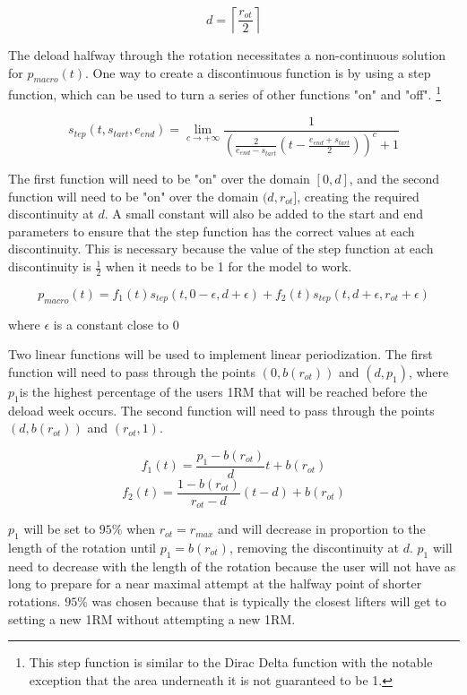 \begin{equation}
    d=\left\lceil\frac{r_{ot}}{2}\right\rceil
\end{equation}

The deload halfway through the rotation necessitates a non-continuous solution for $p_{macro}(t)$. One way to create a  discontinuous function is by using a step function, which can be used to turn a series of other functions "on" and "off". \footnote{This step function is similar to the Dirac Delta function with the notable exception that the area underneath it is not guaranteed to be 1.}

\begin{equation}
    s_{tep}(t,s_{tart},e_{end})=
    \lim_{c \to +\infty} 
    \frac{1}{\left(\frac{2}{e_{end}-s_{tart}}\left(t-\frac{e_{end}+s_{tart}}{2}\right)\right)^c+1}
\end{equation}

The first function will need to be "on" over the domain $[0,d]$, and the second function will need to be "on" over the domain $(d,r_{ot}]$, creating the required discontinuity at $d$. A small constant will also be added to the start and end parameters to ensure that the step function has the correct values at each discontinuity. This is necessary because the value of the step function at each discontinuity is $\frac{1}{2}$ when it needs to be 1 for the model to work.

\begin{equation}
    p_{macro}(t)=f_1(t)s_{tep}(t,0-\epsilon,d+\epsilon)+
                 f_2(t)s_{tep}(t,d+\epsilon,r_{ot}+\epsilon)
\end{equation}
\centerline{where $\epsilon$ is a constant close to 0}

Two linear functions will be used to implement linear periodization. The first function will need to pass through the points $(0,b(r_{ot}))$ and $(d,p_1)$, where $p_1$is the highest percentage of the users 1RM that will be reached before the deload week occurs. The second function will need to pass through the points $(d,b(r_{ot}))$ and $(r_{ot},1)$.

\begin{equation*}
    f_1(t)=\frac{p_1-b(r_{ot})}{d}t+b(r_{ot})
\end{equation*}
\begin{equation}
    f_2(t)=\frac{1-b(r_{ot})}{r_{ot}-d}(t-d)+b(r_{ot})
\end{equation}

$p_1$ will be set to $95\%$ when $r_{ot}=r_{max}$ and will decrease in proportion to the length of the rotation until $p_1=b(r_{ot})$, removing the discontinuity at $d$. $p_1$ will need to decrease with the length of the rotation because the user will not have as long to prepare for a near maximal attempt at the halfway point of shorter rotations. $95\%$ was chosen because that is typically the closest lifters will get to setting a new 1RM without attempting a new 1RM.

